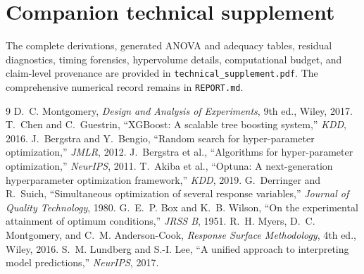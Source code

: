 \documentclass[12pt,a4paper]{article}
\begin{document}
\section*{Companion technical supplement}
The complete derivations, generated ANOVA and adequacy tables, residual diagnostics, timing forensics, hypervolume details, computational budget, and claim-level provenance are provided in \texttt{technical\_supplement.pdf}. The comprehensive numerical record remains in \texttt{REPORT.md}.

\clearpage
\begin{thebibliography}{9}
\small
\setlength{\itemsep}{0pt}
 D.~C. Montgomery, \emph{Design and Analysis of Experiments}, 9th ed., Wiley, 2017.
 T.~Chen and C.~Guestrin, ``XGBoost: A scalable tree boosting system,'' \emph{KDD}, 2016.
 J.~Bergstra and Y.~Bengio, ``Random search for hyper-parameter optimization,'' \emph{JMLR}, 2012.
 J.~Bergstra et al., ``Algorithms for hyper-parameter optimization,'' \emph{NeurIPS}, 2011.
 T.~Akiba et al., ``Optuna: A next-generation hyperparameter optimization framework,'' \emph{KDD}, 2019.
 G.~Derringer and R.~Suich, ``Simultaneous optimization of several response variables,'' \emph{Journal of Quality Technology}, 1980.
 G.~E.~P. Box and K.~B. Wilson, ``On the experimental attainment of optimum conditions,'' \emph{JRSS B}, 1951.
 R.~H. Myers, D.~C. Montgomery, and C.~M. Anderson-Cook, \emph{Response Surface Methodology}, 4th ed., Wiley, 2016.
 S.~M. Lundberg and S.-I. Lee, ``A unified approach to interpreting model predictions,'' \emph{NeurIPS}, 2017.
\end{thebibliography}
\end{document}
